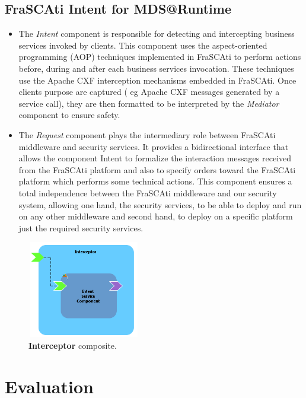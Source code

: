 \documentclass[runningheads,a4paper]{llncs}
\begin{document}
\subsection{FraSCAti Intent for MDS@Runtime}
\begin{itemize}
\settowidth{\leftmargin}{{\Large$\square$}}\advance\leftmargin{}
\itemsep8pt\relax
\renewcommand\labelitemi{{\lower1.5pt\hbox{\Large$\square$}}}
\item The \emph{Intent} component is responsible for detecting and intercepting business services invoked  by clients. This component uses the aspect-oriented programming (AOP) techniques implemented in FraSCAti to perform actions before, during and after each business services invocation. These techniques use the Apache CXF interception mechanisms embedded in FraSCAti. Once clients purpose are captured ( eg Apache CXF messages generated by a service call), they are then formatted to be interpreted by the \emph{Mediator} component to ensure safety.
\item The \emph{Request} component plays the intermediary role between FraSCAti middleware and security services. It provides a bidirectional interface that allows the component Intent to formalize the interaction messages received from the FraSCAti platform and also to specify orders toward the FraSCAti platform which performs some technical actions. This component ensures a total independence between the FraSCAti middleware and our security system, allowing one hand, the security services,  to be able to deploy and run on any other middleware and second hand, to deploy on a specific platform just the required security services.
\end{itemize}
\begin{figure}[ht]  
\centering
\includegraphics[height=120pt, width=140pt]{interceptorComponent1.png}
\caption{\textbf{Interceptor} composite.}
\label{fig:mdsAtRuntime}
\end{figure}

\section{Evaluation}
\end{document}
